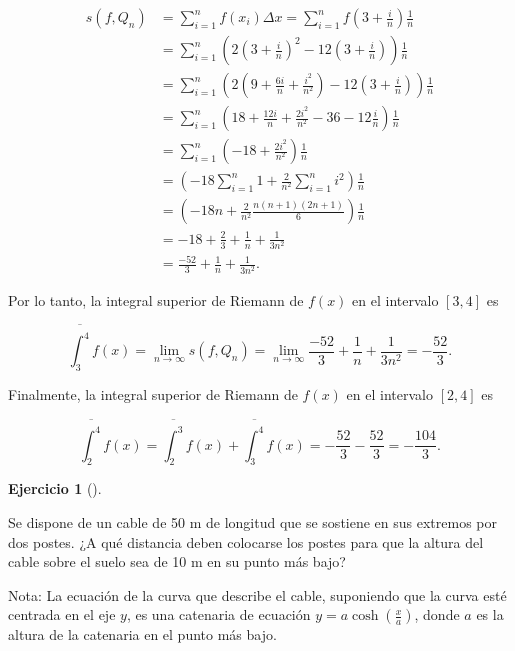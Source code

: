 \documentclass[
  a4paper,
]{scrreport}
\theoremstyle{definition}
\newtheorem{exercise}{Ejercicio}[chapter]
\theoremstyle{remark}
\begin{document}
\begin{tcolorbox}
\begin{align*}
s(f,Q_n)
&= \sum_{i=1}^{n} f(x_i) \Delta x = \sum_{i=1}^{n} f\left(3 + \frac{i}{n}\right) \frac{1}{n} \\
&= \sum_{i=1}^{n} \left(2\left(3 + \frac{i}{n}\right)^2 - 12\left(3 + \frac{i}{n}\right)\right) \frac{1}{n} \\
&= \sum_{i=1}^{n} \left(2\left(9 + \frac{6i}{n} + \frac{i^2}{n^2}\right) - 12\left(3 + \frac{i}{n}\right)\right) \frac{1}{n} \\
&= \sum_{i=1}^{n} \left(18 + \frac{12i}{n} + \frac{2i^2}{n^2} - 36 - 12\frac{i}{n}\right) \frac{1}{n} \\
&= \sum_{i=1}^{n} \left(-18 + \frac{2i^2}{n^2} \right) \frac{1}{n} \\
&= \left(-18\sum_{i=1}^{n} 1 + \frac{2}{n^2}\sum_{i=1}^n i^2 \right) \frac{1}{n} \\
&= \left(-18n + \frac{2}{n^2} \frac{n(n+1)(2n+1)}{6} \right) \frac{1}{n} \\
&= -18 + \frac{2}{3} + \frac{1}{n} + \frac{1}{3n^2} \\
&= \frac{-52}{3} + \frac{1}{n} + \frac{1}{3n^2}.
\end{align*}

Por lo tanto, la integral superior de Riemann de \(f(x)\) en el
intervalo \([3, 4]\) es

\[
\overline{\int_3^4} f(x)
= \lim_{n \to \infty} s(f,Q_n)
= \lim_{n \to \infty} \frac{-52}{3} + \frac{1}{n} + \frac{1}{3n^2} 
= -\frac{52}{3}.
\]

Finalmente, la integral superior de Riemann de \(f(x)\) en el intervalo
\([2, 4]\) es

\[
\overline{\int_2^4} f(x)
= \overline{\int_2^3} f(x) + \overline{\int_3^4} f(x)
= -\frac{52}{3} - \frac{52}{3}
= -\frac{104}{3}.
\]

\end{tcolorbox}

\begin{exercise}[]\protect\hypertarget{exr-2}{}\label{exr-2}

Se dispone de un cable de 50 m de longitud que se sostiene en sus
extremos por dos postes. ¿A qué distancia deben colocarse los postes
para que la altura del cable sobre el suelo sea de 10 m en su punto más
bajo?

Nota: La ecuación de la curva que describe el cable, suponiendo que la
curva esté centrada en el eje \(y\), es una catenaria de ecuación
\(y = a \cosh \left( \frac{x}{a} \right)\), donde \(a\) es la altura de
la catenaria en el punto más bajo.

\end{exercise}
\end{document}
